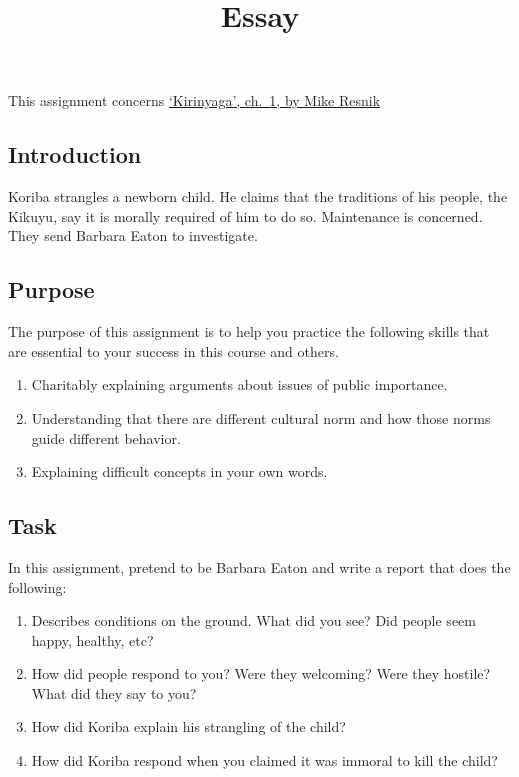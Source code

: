 \documentclass[]{article}
\title{Essay}
\date{}
\begin{document}
\maketitle

This assignment concerns
\href{/Teaching/Examined/Ethics/Kirinyaga.pdf}{`Kirinyaga', ch.~1, by
Mike Resnik}

\subsection{Introduction}\label{introduction}

Koriba strangles a newborn child. He claims that the traditions of his
people, the Kikuyu, say it is morally required of him to do so.
Maintenance is concerned. They send Barbara Eaton to investigate.

\subsection{Purpose}\label{purpose}

The purpose of this assignment is to help you practice the following
skills that are essential to your success in this course and others.

\begin{enumerate}
\def\labelenumi{\arabic{enumi}.}
\itemsep1pt\parskip0pt
\item
  Charitably explaining arguments about issues of public importance.
\item
  Understanding that there are different cultural norm and how those
  norms guide different behavior.
\item
  Explaining difficult concepts in your own words.
\end{enumerate}

\subsection{Task}\label{task}

In this assignment, pretend to be Barbara Eaton and write a report that
does the following:

\begin{enumerate}
\def\labelenumi{\arabic{enumi}.}
\itemsep1pt\parskip0pt
\item
  Describes conditions on the ground. What did you see? Did people seem
  happy, healthy, etc?
\item
  How did people respond to you? Were they welcoming? Were they hostile?
  What did they say to you?
\item
  How did Koriba explain his strangling of the child?
\item
  How did Koriba respond when you claimed it was immoral to kill the
  child?
\end{enumerate}
\end{document}
